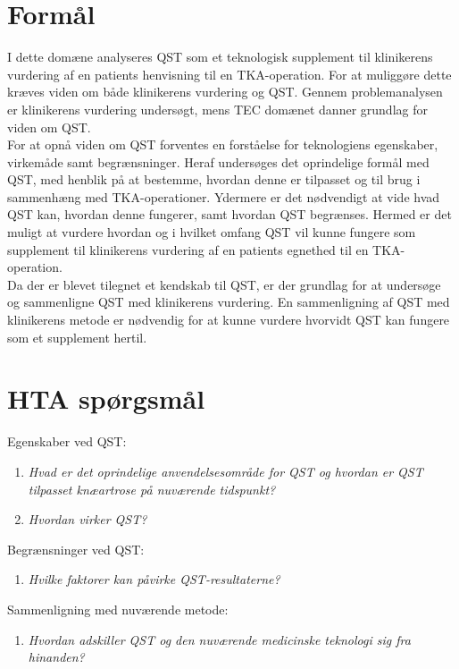 \section{Formål} 
I dette domæne analyseres QST som et teknologisk supplement til klinikerens vurdering af en patients henvisning til en TKA-operation. For at muliggøre dette kræves viden om både klinikerens vurdering og QST. Gennem problemanalysen er klinikerens vurdering undersøgt, mens TEC domænet danner grundlag for viden om QST.\\
For at opnå viden om QST forventes en forståelse for teknologiens egenskaber, virkemåde samt begrænsninger. Heraf undersøges det oprindelige formål med QST, med henblik på at bestemme, hvordan denne er tilpasset og til brug i sammenhæng med TKA-operationer. Ydermere er det nødvendigt at vide hvad QST kan, hvordan denne fungerer, samt hvordan QST begrænses. Hermed er det muligt at vurdere hvordan og i hvilket omfang QST vil kunne fungere som supplement til klinikerens vurdering af en patients egnethed til en TKA-operation.\\
Da der er blevet tilegnet et kendskab til QST, er der grundlag for at undersøge og sammenligne QST med klinikerens vurdering. En sammenligning af QST med klinikerens metode er nødvendig for at kunne vurdere hvorvidt QST kan fungere som et supplement hertil. 

\section{HTA spørgsmål}
Egenskaber ved QST:
\begin{enumerate}
	\item \textit{Hvad er det oprindelige anvendelsesområde for QST og hvordan er QST tilpasset knæartrose på nuværende tidspunkt?} %
	\item \textit{Hvordan virker QST?}  %
\end{enumerate}
Begrænsninger ved QST:
\begin{enumerate}[resume]
	\item \textit{Hvilke faktorer kan påvirke QST-resultaterne?}
\end{enumerate}
Sammenligning med nuværende metode:
\begin{enumerate}[resume]
	\item \textit{Hvordan adskiller QST og den nuværende medicinske teknologi sig fra hinanden?} %
\end{enumerate}

